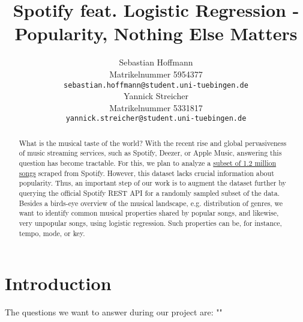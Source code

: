\documentclass{article}
\title{Spotify feat. Logistic Regression - \\ Popularity, Nothing Else Matters}
\author{%
  Sebastian Hoffmann\\
  Matrikelnummer 5954377\\
  \texttt{sebastian.hoffmann@student.uni-tuebingen.de} \\
  \And
  Yannick Streicher\\
  Matrikelnummer 5331817\\
  \texttt{yannick.streicher@student.uni-tuebingen.de} \\
}
\begin{document}
\maketitle

\begin{abstract}
  What is the musical taste of the world? With the recent rise and global pervasiveness of music streaming services, such as Spotify, Deezer, or Apple Music, answering this question has become tractable. For this, we plan to analyze a \href{https://www.kaggle.com/rodolfofigueroa/spotify-12m-songs}{subset of 1.2 million songs} scraped from Spotify. However, this dataset lacks crucial information about popularity. Thus, an important step of our work is to augment the dataset further by querying the official Spotify REST API for a randomly sampled subset of the data. Besides a birds-eye overview of the musical landscape, e.g. distribution of genres, we want to identify common musical properties shared by popular songs, and likewise, very unpopular songs, using logistic regression. Such properties can be, for instance, tempo, mode, or key.
\end{abstract}

\section{Introduction}
The questions we want to answer during our project are: ""
\end{document}

